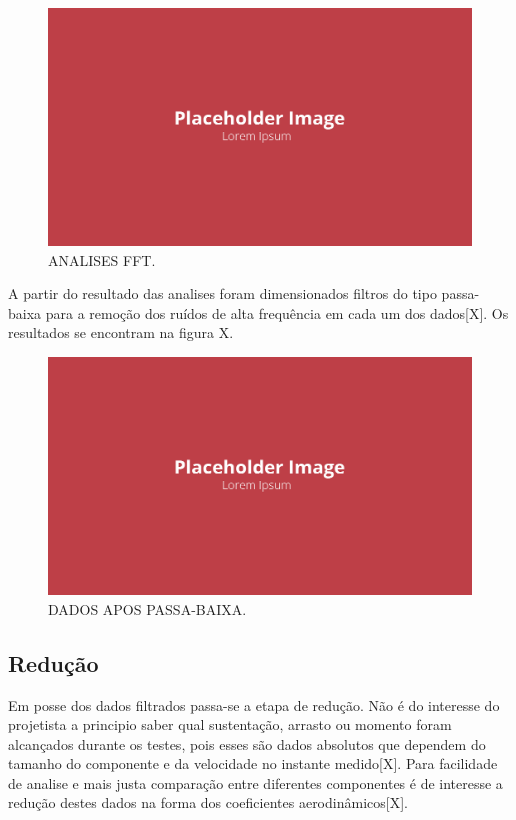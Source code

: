 \begin{figure}[!ht]
    \centering
    \includegraphics[width=.8\linewidth]{figuras/outras/placeholder.png}
    \caption{ANALISES FFT\cite{autor}.}
    \label{fig:placeholder}
\end{figure}

A partir do resultado das analises foram dimensionados filtros do tipo passa-baixa para a remoção dos ruídos de alta frequência em cada um dos dados[X]. Os resultados se encontram na figura X.

\begin{figure}[!ht]
    \centering
    \includegraphics[width=.8\linewidth]{figuras/outras/placeholder.png}
    \caption{DADOS APOS PASSA-BAIXA\cite{autor}.}
    \label{fig:placeholder}
\end{figure}

\subsection{Redução}

Em posse dos dados filtrados passa-se a etapa de redução. Não é do interesse do projetista a principio saber qual sustentação, arrasto ou momento foram alcançados durante os testes, pois esses são dados absolutos que dependem do tamanho do componente e da velocidade no instante medido[X]. Para facilidade de analise e mais justa comparação entre diferentes componentes é de interesse a redução destes dados na forma dos coeficientes aerodinâmicos[X].

